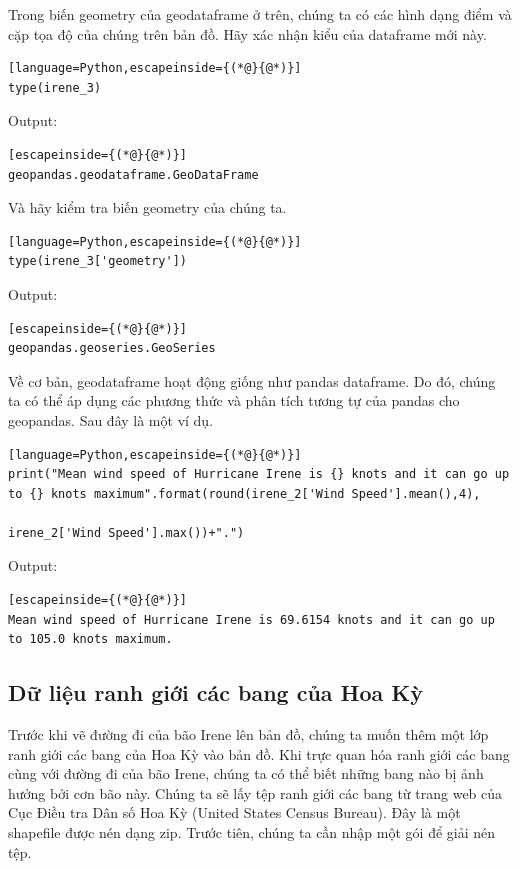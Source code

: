 Trong biến geometry của geodataframe ở trên, chúng ta có các hình dạng điểm và cặp tọa độ của chúng trên bản đồ. Hãy xác nhận kiểu của dataframe mới này.

\begin{lstlisting}[language=Python,escapeinside={(*@}{@*)}]
type(irene_3)
\end{lstlisting}

Output:

\begin{lstlisting}[escapeinside={(*@}{@*)}]
geopandas.geodataframe.GeoDataFrame
\end{lstlisting}

Và hãy kiểm tra biến geometry của chúng ta.

\begin{lstlisting}[language=Python,escapeinside={(*@}{@*)}]
type(irene_3['geometry'])
\end{lstlisting}

Output:

\begin{lstlisting}[escapeinside={(*@}{@*)}]
geopandas.geoseries.GeoSeries
\end{lstlisting}

Về cơ bản, geodataframe hoạt động giống như pandas dataframe. Do đó, chúng ta có thể áp dụng các phương thức và phân tích tương tự của pandas cho geopandas. Sau đây là một ví dụ.

\begin{lstlisting}[language=Python,escapeinside={(*@}{@*)}]
print("Mean wind speed of Hurricane Irene is {} knots and it can go up to {} knots maximum".format(round(irene_2['Wind Speed'].mean(),4),
                                                                                         irene_2['Wind Speed'].max())+".")
\end{lstlisting}

Output:

\begin{lstlisting}[escapeinside={(*@}{@*)}]
Mean wind speed of Hurricane Irene is 69.6154 knots and it can go up to 105.0 knots maximum.
\end{lstlisting}

\subsection{Dữ liệu ranh giới các bang của Hoa Kỳ}

Trước khi vẽ đường đi của bão Irene lên bản đồ, chúng ta muốn thêm một lớp ranh giới các bang của Hoa Kỳ vào bản đồ. Khi trực quan hóa ranh giới các bang cùng với đường đi của bão Irene, chúng ta có thể biết những bang nào bị ảnh hưởng bởi cơn bão này. Chúng ta sẽ lấy tệp ranh giới các bang từ trang web của Cục Điều tra Dân số Hoa Kỳ (United States Census Bureau). Đây là một shapefile được nén dạng zip. Trước tiên, chúng ta cần nhập một gói để giải nén tệp.

